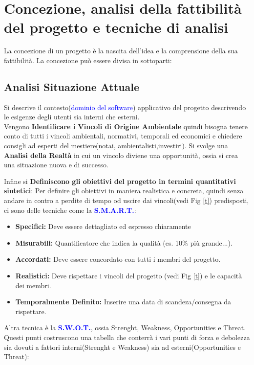 \documentclass{report}
\begin{document}
\section{Concezione, analisi della fattibilità del progetto e tecniche di analisi}
La concezione di un progetto è la nascita dell'idea e la comprensione della sua fattibilità.
La concezione può essere divisa in sottoparti:

\subsection{Analisi Situazione Attuale}
Si descrive il contesto(\textcolor{blue}{dominio del software}) applicativo del progetto descrivendo le esigenze degli utenti sia interni che esterni.\\
Vengono \textbf{Identificare i Vincoli di Origine Ambientale} quindi bisogna tenere conto di tutti i vincoli ambientali, normativi, temporali ed economici e chiedere consigli ad esperti del mestiere(notai, ambientalisti,investiri).
Si svolge una \textbf{Analisi della Realtà} in cui un vincolo diviene una opportunità, ossia si crea una situazione nuova e di successo.

Infine si \textbf{Definiscono gli obiettivi del progetto in termini quantitativi sintetici}:
Per definire gli obiettivi in maniera realistica e concreta, quindi senza andare in contro a perdite di tempo od uscire dai vincoli(vedi Fig \ref{t}) predisposti, ci sono delle tecniche come
la \textbf{\textcolor{blue}{S.M.A.R.T.}}:
\begin{itemize}
	\item \textbf{Specifici:} Deve essere dettagliato ed espresso chiaramente
	\item \textbf{Misurabili:} Quantificatore che indica la qualità (es. 10\% più grande...).
	\item \textbf{Accordati:} Deve essere concordato con tutti i membri del progetto.
	\item \textbf{Realistici:} Deve rispettare i vincoli del progetto (vedi Fig \ref{t}) e le 										capacità dei membri.
	\item \textbf{Temporalmente Definito:} Inserire una data di scandeza/consegna da rispettare.
\end{itemize}
Altra tecnica è la \textbf{\textcolor{blue}{S.W.O.T.}}, ossia Strenght, Weakness, Opportunities e Threat.
Questi punti costruscono una tabella che conterrà i vari punti di forza e debolezza sia dovuti a fattori interni(Strenght e Weakness) sia ad esterni(Opportunities e Threat):
\end{document}
